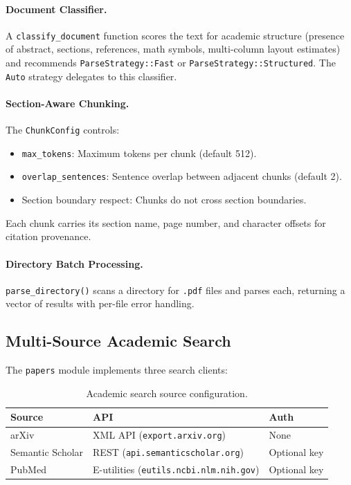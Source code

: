 \documentclass[11pt,twocolumn]{article}
\begin{document}
\paragraph{Document Classifier.} A \texttt{classify\_document} function scores the text for academic structure (presence of abstract, sections, references, math symbols, multi-column layout estimates) and recommends \texttt{ParseStrategy::Fast} or \texttt{ParseStrategy::Structured}. The \texttt{Auto} strategy delegates to this classifier.

\paragraph{Section-Aware Chunking.} The \texttt{ChunkConfig} controls:
\begin{itemize}[nosep]
  \item \texttt{max\_tokens}: Maximum tokens per chunk (default 512).
  \item \texttt{overlap\_sentences}: Sentence overlap between adjacent chunks (default 2).
  \item Section boundary respect: Chunks do not cross section boundaries.
\end{itemize}

Each chunk carries its section name, page number, and character offsets for citation provenance.

\paragraph{Directory Batch Processing.} \texttt{parse\_directory()} scans a directory for \texttt{.pdf} files and parses each, returning a vector of results with per-file error handling.

\subsection{Multi-Source Academic Search}

The \texttt{papers} module implements three search clients:

\begin{table}[h]
\centering\small
\begin{tabular}{@{}lll@{}}
\toprule
\textbf{Source} & \textbf{API} & \textbf{Auth} \\
\midrule
arXiv & XML API (\texttt{export.arxiv.org}) & None \\
Semantic Scholar & REST (\texttt{api.semanticscholar.org}) & Optional key \\
PubMed & E-utilities (\texttt{eutils.ncbi.nlm.nih.gov}) & Optional key \\
\bottomrule
\end{tabular}
\caption{Academic search source configuration.}
\end{table}
\end{document}
